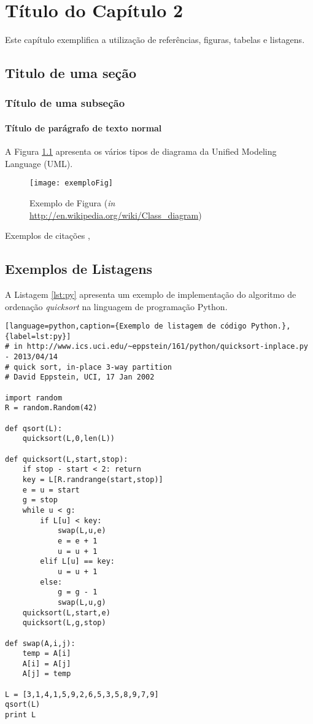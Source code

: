 \chapter{Título do Capítulo 2}
\label{cap2}

Este capítulo exemplifica a utilização de referências, figuras, tabelas e listagens.

\section{Titulo de uma seção}
\subsection{Título de uma subseção}
\subsubsection{Título de parágrafo de texto normal}


A Figura \ref{fig:exemplofig} apresenta os vários tipos de diagrama da Unified Modeling Language (UML).

\begin{figure}[!htb]
\centering
\texttt{[image: exemploFig]}
\caption{Exemplo de Figura (\textit{in} \url{http://en.wikipedia.org/wiki/Class_diagram})}
\label{fig:exemplofig}
\end{figure}

Exemplos de citações \cite{AndroidTools},
\cite{Huetal2000,book:Brooks1995,Chen1976}


\section{Exemplos de Listagens}

A Listagem \ref{lst:py} apresenta um exemplo de implementação do algoritmo de ordenação \textit{quicksort} na linguagem de programação Python.

\begin{lstlisting}[language=python,caption={Exemplo de listagem de código Python.},{label=lst:py}]
# in http://www.ics.uci.edu/~eppstein/161/python/quicksort-inplace.py - 2013/04/14
# quick sort, in-place 3-way partition
# David Eppstein, UCI, 17 Jan 2002

import random
R = random.Random(42)

def qsort(L):
	quicksort(L,0,len(L))

def quicksort(L,start,stop):
	if stop - start < 2: return
	key = L[R.randrange(start,stop)]
	e = u = start
	g = stop
	while u < g:
		if L[u] < key:
			swap(L,u,e)
			e = e + 1
			u = u + 1
		elif L[u] == key:
			u = u + 1
		else:
			g = g - 1
			swap(L,u,g)
	quicksort(L,start,e)
	quicksort(L,g,stop)

def swap(A,i,j):
	temp = A[i]
	A[i] = A[j]
	A[j] = temp

L = [3,1,4,1,5,9,2,6,5,3,5,8,9,7,9]
qsort(L)
print L
\end{lstlisting}


